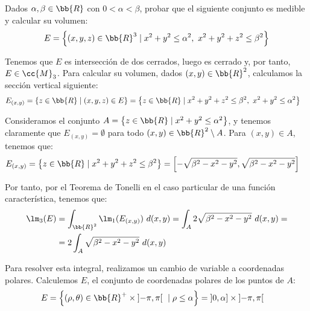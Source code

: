 \begin{ejercicio}
    Dados $\alpha, \beta \in \bb{R}$ con $0 < \alpha < \beta$, probar que el siguiente conjunto es medible y calcular su volumen:
    \[ E = \left\{ (x, y, z) \in \bb{R}^3 \mid x^2 + y^2 \leq \alpha^2,~x^2 + y^2 + z^2 \leq \beta^2 \right\} \]

    Tenemos que $E$ es intersección de dos cerrados,
    luego es cerrado y, por tanto, $E\in \cc{M}_3$. Para calcular su volumen,
    dados $(x,y)\in \bb{R}^2$, calculamos la sección vertical siguiente:
    \begin{align*}
        E_{(x,y)} &= \left\{ z\in \bb{R} \mid (x, y, z) \in E \right\} = \left\{ z\in \bb{R} \mid x^2 + y^2 + z^2 \leq \beta^2,~x^2 + y^2 \leq \alpha^2 \right\}
    \end{align*}

    Consideramos el conjunto $A = \left\{ z\in \bb{R} \mid x^2 + y^2 \leq \alpha^2 \right\}$, y tenemos claramente que
    $E_{(x,y)} = \emptyset$ para todo $(x,y)\in \bb{R}^2\setminus A$. Para $(x,y)\in A$, tenemos que:
    \begin{align*}
        E_{(x,y)} &= \left\{ z\in \bb{R} \mid x^2 + y^2 + z^2 \leq \beta^2 \right\} = \left[ -\sqrt{\beta^2 - x^2 - y^2}, \sqrt{\beta^2 - x^2 - y^2} \right]
    \end{align*}

    Por tanto, por el Teorema de Tonelli en el caso particular de una función característica, tenemos que:
    \begin{align*}
        \lm_3(E) &= \int_{\bb{R}^2} \lm_1(E_{(x,y)})~d(x, y) = \int_{A} 2\sqrt{\beta^2 - x^2 - y^2}~d(x, y) =\\
        &= 2\int_{A} \sqrt{\beta^2 - x^2 - y^2}~d(x, y)
    \end{align*}

    Para resolver esta integral, realizamos un cambio de variable a coordenadas polares. Calculemos $E$, el conjunto de coordenadas polares de los puntos de $A$:
    \begin{align*}
        E &= \left\{ (\rho, \theta) \in \bb{R}^+\times \left]-\pi, \pi\right[ ~\mid \rho \leq \alpha \right\} = \left]0, \alpha\right]\times \left]-\pi, \pi\right[
    \end{align*}


\end{ejercicio}
